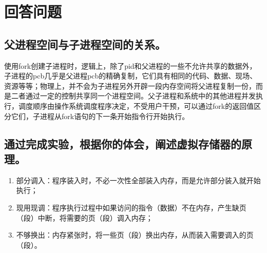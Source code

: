 \documentclass[11pt]{article}
\begin{document}
\section{回答问题}
\subsection{父进程空间与子进程空间的关系。}
使用fork创建子进程时，逻辑上，除了pid和父进程的一些不允许共享的数据外，子进程的pcb几乎是父进程pcb的精确复制，它们具有相同的代码、数据、现场、资源等等；物理上，并不会为子进程另外开辟一段内存空间将父进程复制一份，而是二者通过一定的控制共享同一个进程空间。父子进程和系统中的其他进程并发执行，调度顺序由操作系统调度程序决定，不受用户干预，可以通过fork的返回值区分它们，子进程从fork语句的下一条开始指令行开始执行。

\subsection{通过完成实验，根据你的体会，阐述虚拟存储器的原理。}
\begin{enumerate}
  \item 部分调入：程序装入时，不必一次性全部装入内存，而是允许部分装入就开始执行；
  \item 现用现调：程序执行过程中如果访问的指令（数据）不在内存，产生缺页（段）中断，将需要的页（段）调入内存；
  \item 不够换出：内存紧张时，将一些页（段）换出内存，从而装入需要调入的页（段）。
\end{enumerate}
\end{document}
